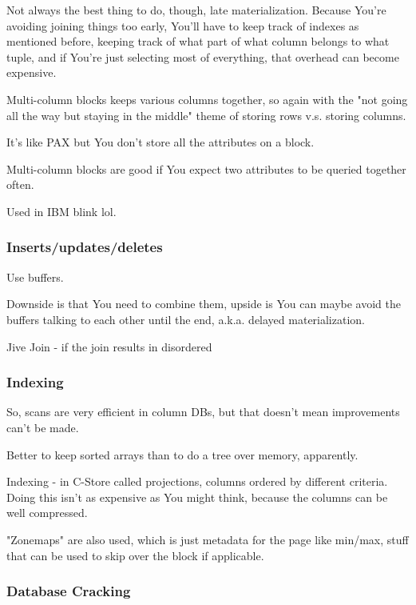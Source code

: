 \documentclass{article}
\begin{document}
			Not always the best thing to do, though, late materialization. Because You're avoiding joining things too early, You'll have to keep track of indexes as mentioned before, keeping track of what part of what column belongs to what tuple, and if You're just selecting most of everything, that overhead can become expensive.
			
			Multi-column blocks keeps various columns together, so again with the "not going all the way but staying in the middle" theme of storing rows v.s. storing columns.
			
			It's like PAX but You don't store all the attributes on a block.
			
			Multi-column blocks are good if You expect two attributes to be queried together often.
			
			Used in IBM blink lol.
			
		\subsubsection{Inserts/updates/deletes}
		
			Use buffers.
			
			Downside is that You need to combine them, upside is You can maybe avoid the buffers talking to each other until the end, a.k.a. delayed materialization.
			
			Jive Join - if the join results in disordered 
			
		\subsubsection{Indexing}
			
			So, scans are very efficient in column DBs, but that doesn't mean improvements can't be made.
			
			Better to keep sorted arrays than to do a tree over memory, apparently.
			
			Indexing - in C-Store called projections, columns ordered by different criteria. Doing this isn't as expensive as You might think, because the columns can be well compressed.
		
			"Zonemaps" are also used, which is just metadata for the page like min/max, stuff that can be used to skip over the block if applicable.
			
		\subsubsection{Database Cracking}
		
\end{document}
